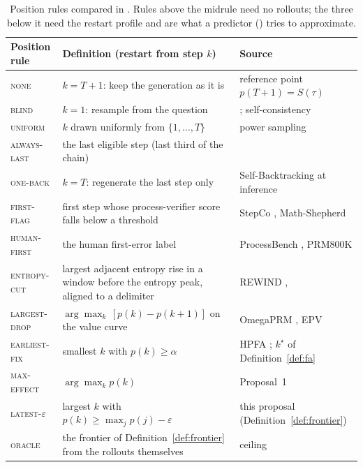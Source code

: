 \documentclass[10pt,a4paper]{article}
\begin{document}
\begin{table}[h]\centering\small
\begin{tabularx}{\linewidth}{@{}>{\RaggedRight\hsize=0.75\hsize}X >{\RaggedRight\hsize=1.35\hsize}X >{\RaggedRight\hsize=0.9\hsize}X@{}}\toprule
Position rule & Definition (restart from step $k$) & Source \\\midrule
\textsc{none} & $k=T{+}1$: keep the generation as it is & reference point $p(T{+}1)=S(\tau)$ \\
\textsc{blind} & $k=1$: resample from the question & \citet{verma2026tryagain}; self-consistency \\
\textsc{uniform} & $k$ drawn uniformly from $\{1,\dots,T\}$ & power sampling \cite{karan2026power} \\
\textsc{always-last} & the last eligible step (last third of the chain) & \citet{atri2026expanding} \\
\textsc{one-back} & $k=T$: regenerate the last step only & Self-Backtracking at inference \cite{yang2025selfbacktrack} \\
\textsc{first-flag} & first step whose process-verifier score falls below a threshold & StepCo \cite{wu2024stepco}, Math-Shepherd \cite{wang2024mathshepherd} \\
\textsc{human-first} & the human first-error label & ProcessBench \cite{zheng2024processbench}, PRM800K \cite{lightman2023prm} \\
\textsc{entropy-cut} & largest adjacent entropy rise in a window before the entropy peak, aligned to a delimiter & REWIND \cite{ding2026rewind}, \citet{zhou2026entropycut} \\
\textsc{largest-drop} & $\arg\max_k\,[p(k)-p(k{+}1)]$ on the value curve & OmegaPRM \cite{luo2024omegaprm}, EPV \cite{shen2026epv} \\
\textsc{earliest-fix} & smallest $k$ with $p(k)\ge\alpha$ & HPFA \cite{zhu2026hpfa}; $k^\star$ of Definition~\ref{def:fa} \\
\textsc{max-effect} & $\arg\max_k p(k)$ & Proposal~1 \\
\textsc{latest-}$\varepsilon$ & largest $k$ with $p(k)\ge\max_j p(j)-\varepsilon$ & this proposal (Definition~\ref{def:frontier}) \\
\textsc{oracle} & the frontier of Definition~\ref{def:frontier} from the rollouts themselves & ceiling \\\bottomrule
\end{tabularx}
\caption{Position rules compared in . Rules above the midrule need no rollouts; the three below it need the restart profile and are what a predictor () tries to approximate.}
\label{tab:rules}
\end{table}
\end{document}
